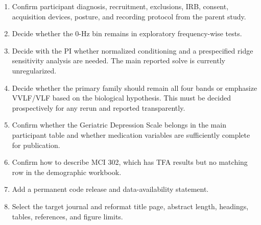 \documentclass[12pt]{article}
\begin{document}
\begin{enumerate}[leftmargin=0.45in]
    \item Confirm participant diagnosis, recruitment, exclusions, IRB, consent,
    acquisition devices, posture, and recording protocol from the parent study.
    \item Decide whether the 0-Hz bin remains in exploratory frequency-wise
    tests.
    \item Decide with the PI whether normalized conditioning and a prespecified
    ridge sensitivity analysis are needed. The main reported solve is currently
    unregularized.
    \item Decide whether the primary family should remain all four bands or
    emphasize VVLF/VLF based on the biological hypothesis. This must be decided
    prospectively for any rerun and reported transparently.
    \item Confirm whether the Geriatric Depression Scale belongs in the main
    participant table and whether medication variables are sufficiently
    complete for publication.
    \item Confirm how to describe MCI 302, which has TFA results but no matching
    row in the demographic workbook.
    \item Add a permanent code release and data-availability statement.
    \item Select the target journal and reformat title page, abstract length,
    headings, tables, references, and figure limits.
\end{enumerate}

\end{document}
